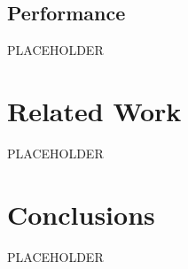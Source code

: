 \documentclass[conference]{IEEEtran}
\begin{document}

\subsection{Performance}

PLACEHOLDER




\section{Related Work}

PLACEHOLDER 



\section{Conclusions}

PLACEHOLDER





\end{document}
